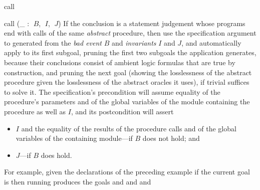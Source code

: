 \begin{tactic}{call}
  \begin{tsyntax}{call (_ : $\;B$, $\;I$, $\;J$)}
    If the conclusion is a \prhl statement judgement whose programs
    end with calls of the same \emph{abstract} procedure, then use the
    specification argument to  generated from the \emph{bad
      event} $B$ and \emph{invariants} $I$ and $J$, and automatically
    apply  to its first subgoal, pruning
    the first two subgoals the application generates, because their
    conclusions consist of ambient logic formulas that are true by
    construction, and pruning the next goal (showing the losslessness
    of the abstract procedure given the losslessness of the abstract
    oracles it uses), if trivial suffices to solve it.  The
    specification's precondition will assume equality of the
    procedure's parameters and of the global variables of the module
    containing the procedure as well as $I$, and its postcondition
    will assert
    \begin{itemize}
    \item $I$ and the equality of the results of the procedure calls
      and of the global variables of the containing module---if $B$
      does not hold; and

    \item $J$---if $B$ does hold.
    \end{itemize}

    \medskip
    For example, given the declarations of the preceding example
    if the current goal is
    then running
    produces the goals
     and
     and
     and
  \end{tsyntax}
\end{tactic}
